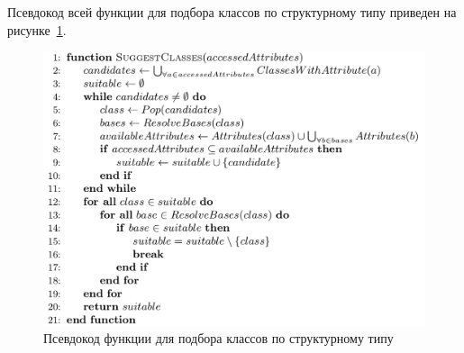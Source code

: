 Псевдокод всей функции для подбора классов по структурному типу приведен на
рисунке~\ref{fig:pseudocode}.


\begin{figure}
\begin{center}
    \includegraphics[width=\textwidth]{fig/pseudocode.png}
\end{center}
\caption{Псевдокод функции для подбора классов по структурному типу}
\label{fig:pseudocode}
\end{figure}

